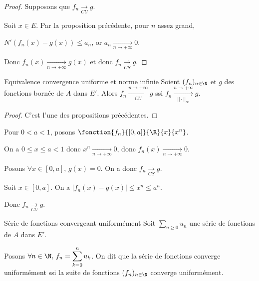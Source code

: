 
\begin{proof}
    Supposons que $f_n \xrightarrow[CU]{} g$.

    Soit $x \in E$. Par la proposition précédente, pour $n$ assez grand,

    $N'(f_n(x) - g(x)) \leqslant a_n$, or $a_n \xrightarrow[n\to +\infty]{} 0$.

    Donc $f_n(x) \xrightarrow[n\to +\infty]{} g(x)$ et donc $f_n \xrightarrow[CS]{} g$.
\end{proof}

\begin{proposition}{Equivalence convergence uniforme et norme infinie}{}
    Soient $(f_n)_{n \in \N}$ et $g$ des fonctions bornée de $A$ dans $E'$.
    Alors $f_n \xrightarrow[CU]{n \to + \infty} g$ ssi $\displaystyle f_n \xrightarrow[||\cdot ||_{\infty}]{n \to + \infty} g$.
\end{proposition}

\begin{proof}
    C'est l'une des propositions précédentes.
\end{proof}

\begin{exemple}
    Pour $0 < a < 1$, posons $\displaystyle \fonction{f_n}{[0, a]}{\R}{x}{x^n}$.


    \avspace On a $0 \leqslant x \leqslant a < 1$ donc $x^n \xrightarrow[n\to +\infty]{} 0$, donc 
    $f_n(x) \xrightarrow[n\to +\infty]{} 0$.

    Posons $\forall x \in [0, a], \, g(x) = 0$. On a donc $f_n \xrightarrow[CS]{} g$.


    \avspace Soit $x \in [0, a]$. On a $\displaystyle |f_n(x) - g(x)| \leqslant x^n \leqslant a^n$.

    Donc $f_n \xrightarrow[CU]{} g$.
\end{exemple}


\begin{definition}{Série de fonctions convergeant uniformément}{}
    Soit $ \sum_{n \geqslant 0} u_n$ une série de fonctions de $A$ dans $E'$. 

    Posons $\displaystyle \forall n \in \N, \, f_n = \sum_{k = 0}^n u_k$. On dit que la série de fonctions converge 
    uniformément ssi la suite de fonctions $(f_n)_{n \in \N}$ converge uniformément.
\end{definition}

